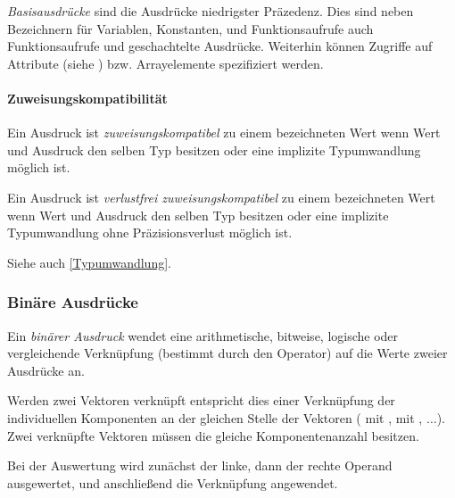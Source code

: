 \emph{Basisausdrücke} sind die Ausdrücke niedrigster Präzedenz. Dies sind neben Bezeichnern
für Variablen, Konstanten, und Funktionsaufrufe auch Funktionsaufrufe und geschachtelte Ausdrücke.
Weiterhin können Zugriffe auf Attribute (siehe ) bzw. Arrayelemente spezifiziert werden.


\paragraph{Zuweisungskompatibilität}\label{Zuweisungskompatibilitaet}

Ein Ausdruck ist \emph{zuweisungskompatibel} zu einem bezeichneten Wert wenn
Wert und Ausdruck den selben Typ besitzen oder eine implizite Typumwandlung
möglich ist.

Ein Ausdruck ist \emph{verlustfrei zuweisungskompatibel} zu einem bezeichneten Wert
wenn Wert und Ausdruck den selben Typ besitzen oder eine implizite Typumwandlung
ohne Präzisionsverlust möglich ist.

Siehe auch \ref{Typumwandlung}.


\subsubsection{Binäre Ausdrücke}\label{Binaere Ausdruecke}

Ein \emph{binärer Ausdruck} wendet eine arithmetische, bitweise, logische oder vergleichende Verknüpfung
(bestimmt durch den Operator) auf die Werte zweier Ausdrücke an.

Werden zwei Vektoren verknüpft entspricht dies einer Verknüpfung der individuellen Komponenten an der gleichen
Stelle der Vektoren ( mit ,  mit , $\dots$). Zwei verknüpfte Vektoren müssen
die gleiche Komponentenanzahl besitzen.

Bei der Auswertung wird zunächst der linke, dann der rechte Operand ausgewertet, und an\-schließend die Verknüpfung angewendet.

